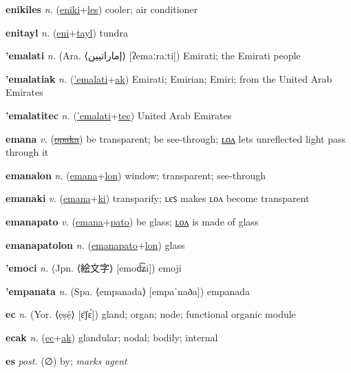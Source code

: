 \textbf{\hypertarget{enikiles}{enikiles}} \textit{n.} (\hyperlink{eniki}{eniki}+\allowbreak \hyperlink{les}{les})
cooler; air conditioner

\textbf{\hypertarget{enitayl}{enitayl}} \textit{n.} (\hyperlink{eni}{eni}+\allowbreak \hyperlink{tayl}{tayl})
tundra

\textbf{\hypertarget{'emalati}{'emalati}} \textit{n.} (Ara. ⟨{\arabics{}إماراتيين‎}⟩ [ʔemaːraːti])
Emirati; the Emirati people

\textbf{\hypertarget{'emalatiak}{'emalatiak}} \textit{n.} (\hyperlink{'emalati}{'emalati}+\allowbreak \hyperlink{ak}{ak})
Emirati; Emirian; Emiri; from the United Arab Emirates

\textbf{\hypertarget{'emalatitec}{'emalatitec}} \textit{n.} (\hyperlink{'emalati}{'emalati}+\allowbreak \hyperlink{tec}{tec})
United Arab Emirates

\textbf{\hypertarget{emana}{emana}} \textit{v.} (\hyperlink{opaka}{\sout{opaka}})
be transparent; be see-through; \hyperlink{emanalon}{ʟᴏᴧ} lets unreflected light pass through it

\textbf{\hypertarget{emanalon}{emanalon}} \textit{n.} (\hyperlink{emana}{emana}+\allowbreak \hyperlink{lon}{lon})
window; transparent; see-through

\textbf{\hypertarget{emanaki}{emanaki}} \textit{v.} (\hyperlink{emana}{emana}+\allowbreak \hyperlink{ki}{ki})
transparify; ʟєꜱ makes ʟᴏᴧ become transparent

\textbf{\hypertarget{emanapato}{emanapato}} \textit{v.} (\hyperlink{emana}{emana}+\allowbreak \hyperlink{pato}{pato})
be glass; \hyperlink{emanapatolon}{ʟᴏᴧ} is made of glass

\textbf{\hypertarget{emanapatolon}{emanapatolon}} \textit{n.} (\hyperlink{emanapato}{emanapato}+\allowbreak \hyperlink{lon}{lon})
glass

\textbf{\hypertarget{'emoci}{'emoci}} \textit{n.} (Jpn. ⟨{\japanese{}絵文字}⟩ [emod͡ʑi])
emoji

\textbf{\hypertarget{'empanata}{'empanata}} \textit{n.} (Spa. ⟨empanada⟩ [empaˈnaða])
empanada

\textbf{\hypertarget{ec}{ec}} \textit{n.} (Yor. ⟨ẹṣẹ́⟩ [ɛ̄ʃɛ́])
gland; organ; node; functional organic module

\textbf{\hypertarget{ecak}{ecak}} \textit{n.} (\hyperlink{ec}{ec}+\allowbreak \hyperlink{ak}{ak})
glandular; nodal; bodily; internal

\textbf{\hypertarget{es}{es}} \textit{post.} (∅)
by; \textit{marks agent}

